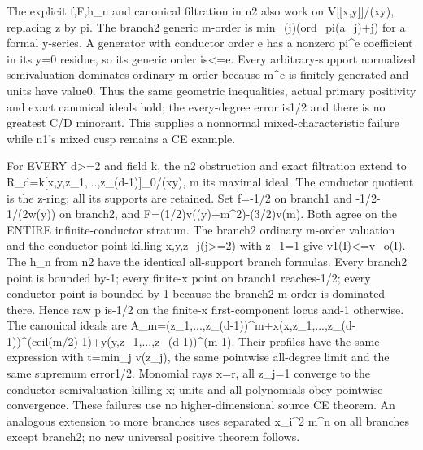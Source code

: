 The explicit f,F,h\_n and canonical filtration in n2 also work on V[[x,y]]/(xy), replacing z by pi. The branch2 generic m-order is min\_(j)(ord\_pi(a\_j)+j) for a formal y-series. A generator with conductor order e has a nonzero pi\textasciicircum{}e coefficient in its y=0 residue, so its generic order is\textless{}=e. Every arbitrary-support normalized semivaluation dominates ordinary m-order because m\textasciicircum{}e is finitely generated and units have value0. Thus the same geometric inequalities, actual primary positivity and exact canonical ideals hold; the every-degree error is1/2 and there is no greatest C/D minorant. This supplies a nonnormal mixed-characteristic failure while n1's mixed cusp remains a CE example.

For EVERY d\textgreater{}=2 and field k, the n2 obstruction and exact filtration extend to R\_d=k[x,y,z\_1,...,z\_(d-1)]\_0/(xy), m its maximal ideal. The conductor quotient is the z-ring; all its supports are retained. Set f=-1/2 on branch1 and -1/2-1/(2w(y)) on branch2, and F=(1/2)v((y)+m\textasciicircum{}2)-(3/2)v(m). Both agree on the ENTIRE infinite-conductor stratum. The branch2 ordinary m-order valuation and the conductor point killing x,y,z\_j(j\textgreater{}=2) with z\_1=1 give v1(I)\textless{}=v\_o(I). The h\_n from n2 have the identical all-support branch formulas. Every branch2 point is bounded by-1; every finite-x point on branch1 reaches-1/2; every conductor point is bounded by-1 because the branch2 m-order is dominated there. Hence raw p is-1/2 on the finite-x first-component locus and-1 otherwise. The canonical ideals are
A\_m=(z\_1,...,z\_(d-1))\textasciicircum{}m+x(x,z\_1,...,z\_(d-1))\textasciicircum{}(ceil(m/2)-1)+y(y,z\_1,...,z\_(d-1))\textasciicircum{}(m-1).
Their profiles have the same expression with t=min\_j v(z\_j), the same pointwise all-degree limit and the same supremum error1/2. Monomial rays x=r, all z\_j=1 converge to the conductor semivaluation killing x; units and all polynomials obey pointwise convergence. These failures use no higher-dimensional source CE theorem. An analogous extension to more branches uses separated x\_i\textasciicircum{}2 m\textasciicircum{}n on all branches except branch2; no new universal positive theorem follows.

